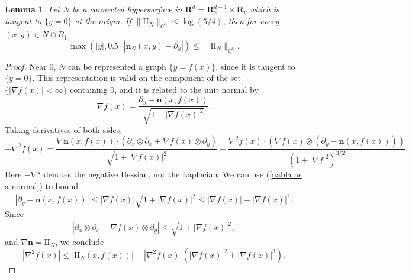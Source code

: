 \documentclass[final,12pt, leqno]{brownthesis}
\newcommand{\RR}{\mathbf{R}}
\newcommand{\Two}{\mathrm{I\!I}}
\newcommand{\normal}{\mathbf n}
\newtheorem{lemma}[theorem]{Lemma}
\theoremstyle{definition}
\numberwithin{equation}{section}
\begin{document}
\begin{lemma}\label{existence of tubes}
	Let $N$ be a connected hypersurface in $\RR^d = \RR^{d - 1}_x \times \RR_y$ which is tangent to $\{y = 0\}$ at the origin.
	If $\|\Two_N\|_{C^0} \leq \log(5/4)$, then for every $(x, y) \in N \cap B_1$,
	$$\max(|y|, 0.5 \cdot |\normal_N(x, y) - \partial_y|) \leq \|\Two_N\|_{C^0}.$$
\end{lemma}
\begin{proof}
	Near $0$, $N$ can be represented a graph $\{y = f(x)\}$, since it is tangent to $\{y = 0\}$.
	This representation is valid on the component of the set $\{|\nabla f(x)| < \infty\}$ containing $0$, and it is related to the unit normal by
\begin{equation}\label{nabla as a normal}
	\nabla f(x) = \frac{\partial_y - \normal(x, f(x))}{\sqrt{1 + |\nabla f(x)|^2}}.
\end{equation}
	Taking derivatives of both sides,
	$$-\nabla^2 f(x) = \frac{\nabla \normal(x, f(x)) \cdot (\partial_x \otimes \partial_x + \nabla f(x) \otimes \partial_y)}{\sqrt{1 + |\nabla f(x)|^2}} + \frac{\nabla^2 f(x) \cdot (\nabla f(x) \otimes (\partial_y - \normal(x, f(x))))}{(1 + |\nabla f|^2)^{3/2}}.$$
	Here $-\nabla^2$ denotes the negative Hessian, not the Laplacian.
	We can use (\ref{nabla as a normal}) to bound
	$$|\partial_y - \normal(x, f(x))| \leq |\nabla f(x)|\sqrt{1 + |\nabla f(x)|^2} \leq |\nabla f(x)| + |\nabla f(x)|^2.$$
	Since
	$$|\partial_x \otimes \partial_x + \nabla f(x) \otimes \partial_y| \leq \sqrt{1 + |\nabla f(x)|^2},$$
	and $\nabla \normal = \Two_N$, we conclude
\begin{equation}\label{bound Hessian by Two}
	|\nabla^2 f(x)| \leq |\Two_N(x, f(x))| + |\nabla^2 f(x)| (|\nabla f(x)|^2 + |\nabla f(x)|^3).
\end{equation}


\end{proof}
\end{document}
